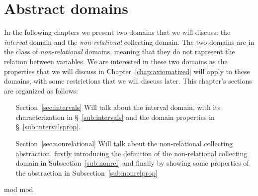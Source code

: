 \chapter{Abstract domains}
\label{chap:abstractdomains}


In the following chapters we present two domains that we will discuss:
the \emph{interval} domain and the \emph{non-relational} collecting
domain. The two domains are in the class of \emph{non-relational}
domains, meaning that they do not rapresent the relation between
variables.  We are interested in these two domains as the
properties that we will discuss in Chapter~\ref{chap:axiomatized} will
apply to these domains, with some restrictions that we will discuss
later.  This chapter's sections are organized as follows:

\begin{itemize}
\item[Section~\ref{sec:intervals}] Will talk about the interval
  domain, with its characterization in \S~\ref{sub:intervals}
  and the domain properties in \S~\ref{sub:intervalsprop}.
\item[Section~\ref{sec:nonrelational}] Will talk about the
  non-relational collecting abstraction, firstly introducing the
  definition of the non-relational collecting domain in
  Subsection~\ref{sub:nonrel} and finally by showing some properties
  of the abstraction in Subsection~\ref{sub:nonrelprop}
\end{itemize}

{mod}
{mod}

